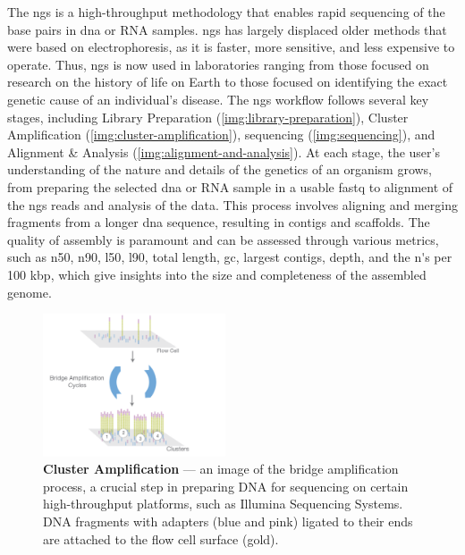 The \gls{ngs} is a high-throughput methodology that enables rapid \gls{sequencing} of the base pairs in \gls{dna} or RNA samples. \gls{ngs} has largely displaced older methods that were based on electrophoresis, as it is faster, more sensitive, and less expensive to operate. Thus, \gls{ngs} is now used in laboratories ranging from those focused on research on the history of life on Earth to those focused on identifying the exact genetic cause of an individual's disease. The \gls{ngs} workflow follows several key stages, including Library Preparation (\autoref{img:library-preparation}), Cluster Amplification (\autoref{img:cluster-amplification}), \gls{sequencing} (\autoref{img:sequencing}), and Alignment \& Analysis (\autoref{img:alignment-and-analysis}). At each stage, the user's understanding of the nature and details of the genetics of an organism grows, from preparing the selected \gls{dna} or RNA sample in a usable \gls{fastq} \cite{Buffalo2015} to alignment of the \gls{ngs} \gls{read}s and analysis of the data. This process involves aligning and merging fragments from a longer \gls{dna} sequence, resulting in \gls{contig}s and \gls{scaffold}s. The quality of \gls{assembly} is paramount and can be assessed through various \gls{metrics}, such as \gls{n50}, \gls{n90}, \gls{l50}, \gls{l90}, \gls{total length}, \gls{gc}, \gls{largest contigs}, \gls{depth}, and the \gls{n's per 100 kbp}, which give insights into the size and completeness of the assembled \gls{genome}.

\begin{figure}
  \centering
  \includegraphics[width=0.48\textwidth]{resources/images/Cluster Amplification.png}
  \caption{\textbf{Cluster Amplification} \cite{Illumina2017-CA} — an image of the bridge amplification process, a crucial step in preparing DNA for sequencing on certain high-throughput platforms, such as Illumina Sequencing Systems. DNA fragments with adapters (blue and pink) ligated to their ends are attached to the flow cell surface (gold).}
  \label{img:cluster-amplification}
\end{figure}

